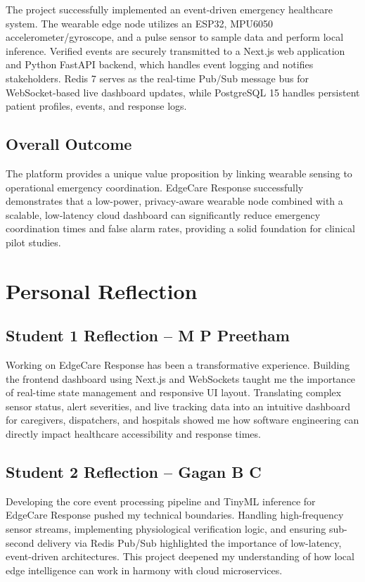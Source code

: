 The project successfully implemented an event-driven emergency healthcare system. The wearable edge node utilizes an ESP32, MPU6050 accelerometer/gyroscope, and a pulse sensor to sample data and perform local inference. Verified events are securely transmitted to a Next.js web application and Python FastAPI backend, which handles event logging and notifies stakeholders. Redis 7 serves as the real-time Pub/Sub message bus for WebSocket-based live dashboard updates, while PostgreSQL 15 handles persistent patient profiles, events, and response logs.

\subsection{Overall Outcome}

The platform provides a unique value proposition by linking wearable sensing to operational emergency coordination. EdgeCare Response successfully demonstrates that a low-power, privacy-aware wearable node combined with a scalable, low-latency cloud dashboard can significantly reduce emergency coordination times and false alarm rates, providing a solid foundation for clinical pilot studies.

\section[Personal Reflection]{\textbf{Personal Reflection}}

\subsection{Student 1 Reflection -- M P Preetham}

Working on EdgeCare Response has been a transformative experience. Building the frontend dashboard using Next.js and WebSockets taught me the importance of real-time state management and responsive UI layout. Translating complex sensor status, alert severities, and live tracking data into an intuitive dashboard for caregivers, dispatchers, and hospitals showed me how software engineering can directly impact healthcare accessibility and response times.

\subsection{Student 2 Reflection -- Gagan B C}

Developing the core event processing pipeline and TinyML inference for EdgeCare Response pushed my technical boundaries. Handling high-frequency sensor streams, implementing physiological verification logic, and ensuring sub-second delivery via Redis Pub/Sub highlighted the importance of low-latency, event-driven architectures. This project deepened my understanding of how local edge intelligence can work in harmony with cloud microservices.

